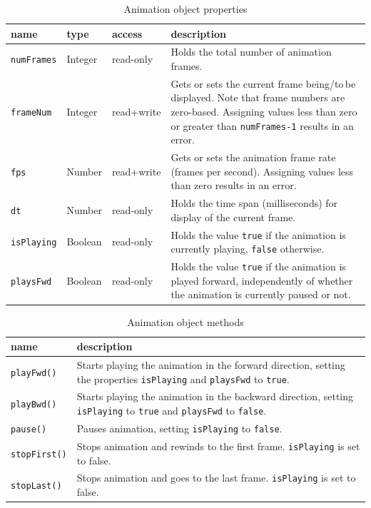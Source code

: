 \documentclass[a4paper]{article}
\begin{document}
\begin{table}[hbp]
\centering
\caption{Animation object properties}\label{tab:props}
\begin{tabularx}{\linewidth}[t]{lllX}\hline
name & type & access & description\\\hline\hline
{\tt numFrames} & Integer & read-only & Holds the total number of animation frames.\\
{\tt frameNum}  & Integer & read+write & Gets or sets the current frame being/to\,be displayed. Note that frame numbers are zero-based. Assigning values less than zero or greater than {\tt numFrames-1} results in an error.\\
{\tt fps} & Number & read+write & Gets or sets the animation frame rate (frames per second). Assigning values less than zero results in an error.\\
{\tt dt} & Number & read-only & Holds the time span (milliseconds) for display of the current frame.\\
{\tt isPlaying} & Boolean & read-only & Holds the value {\tt true} if the animation is currently playing, {\tt false} otherwise.\\
{\tt playsFwd} & Boolean & read-only & Holds the value {\tt true} if the animation is played forward, independently of whether the animation is currently paused or not.\\
\hline
\end{tabularx}
\end{table}

\begin{table}[htbp]
\centering
\caption{Animation object methods}\label{tab:methods}
\begin{tabularx}{\linewidth}[t]{lX}\hline
name & description\\\hline\hline
{\tt playFwd()} & Starts playing the animation in the forward direction, setting the properties {\tt isPlaying} and {\tt playsFwd} to {\tt true}.\\
{\tt playBwd()} & Starts playing the animation in the backward direction, setting {\tt isPlaying} to  {\tt true} and {\tt playsFwd} to {\tt false}.\\
{\tt pause()} & Pauses animation, setting {\tt isPlaying} to {\tt false}.\\
{\tt stopFirst()} & Stops animation and rewinds to the first frame. {\tt isPlaying} is set to false.\\
{\tt stopLast()} & Stops animation and goes to the last frame. {\tt isPlaying} is set to false.\\
\hline
\end{tabularx}
\end{table}
\end{document}

